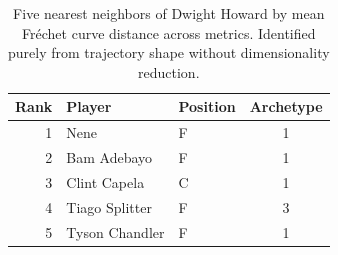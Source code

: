 \begin{table}[htbp]
  \centering\small
  \begin{tabular}{rllc}
    \toprule
    Rank & Player & Position & Archetype \\
    \midrule
    1 & Nene & F & 1 \\
    2 & Bam Adebayo & F & 1 \\
    3 & Clint Capela & C & 1 \\
    4 & Tiago Splitter & F & 3 \\
    5 & Tyson Chandler & F & 1 \\
    \bottomrule
  \end{tabular}
  \caption{Five nearest neighbors of Dwight Howard by mean Fr\'{e}chet curve distance across metrics. Identified purely from trajectory shape without dimensionality reduction.}
  \label{tab:Dwight_Howard_frechet_curve_neighbors}
\end{table}

